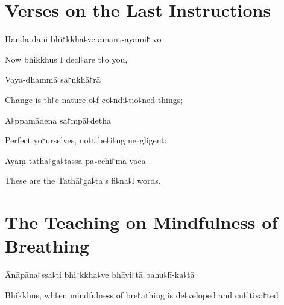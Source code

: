\chapter{Verses on the Last Instructions}%



\begin{leader}
\end{leader}

Handa dāni bhi꜓kkha꜕ve āmant꜕ayāmi꜓ vo

\begin{english}
  Now bhikkhus I decl꜕are t꜕o you,
\end{english}

Vaya-dhammā sa꜓ṅkhā꜓rā

\begin{english}
  Change is th꜓e nature o꜕f co꜕ndi꜕tio꜕ned things;
\end{english}

A꜕ppamādena sa꜓mpā꜕detha


\begin{english}
  Perfect yo꜓urselves, no꜕t be꜕i꜕ng ne꜕gligent:
\end{english}

Ayaṃ tathā꜓ga꜕tassa pa꜕cchi꜓mā vācā

\begin{english}
  These are the Tathā꜓ga꜕ta's fi꜕na꜕l words.
\end{english}

\chapter{The Teaching on Mindfulness of Breathing}%



\begin{leader}
\end{leader}

Ānāpāna꜓ssa꜕ti bhi꜓kkha꜕ve bhāvi꜓tā bahu꜕lī-ka꜕tā

\begin{english}
  Bhikkhus, wh꜕en mindfulness of bre꜓athing is de꜕veloped and cu꜕ltiva꜓ted
\end{english}

